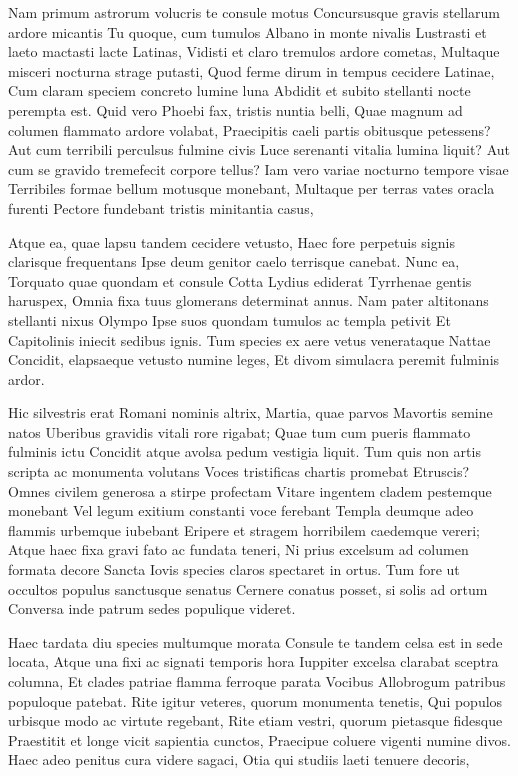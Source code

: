  Nam primum astrorum volucris te consule motus Concursusque gravis stellarum ardore micantis Tu quoque, cum tumulos Albano in monte nivalis Lustrasti et laeto mactasti lacte Latinas, Vidisti et claro tremulos ardore cometas, Multaque misceri nocturna strage putasti, Quod ferme dirum in tempus cecidere Latinae, Cum claram speciem concreto lumine luna Abdidit et subito stellanti nocte perempta est. Quid vero Phoebi fax, tristis nuntia belli, Quae magnum ad columen flammato ardore volabat, Praecipitis caeli partis obitusque petessens? Aut cum terribili perculsus fulmine civis Luce serenanti vitalia lumina liquit? Aut cum se gravido tremefecit corpore tellus? Iam vero variae nocturno tempore visae Terribiles formae bellum motusque monebant, Multaque per terras vates oracla furenti Pectore fundebant tristis minitantia casus,

 Atque ea, quae lapsu tandem cecidere vetusto, Haec fore perpetuis signis clarisque frequentans Ipse deum genitor caelo terrisque canebat. Nunc ea, Torquato quae quondam et consule Cotta Lydius ediderat Tyrrhenae gentis haruspex, Omnia fixa tuus glomerans determinat annus. Nam pater altitonans stellanti nixus Olympo Ipse suos quondam tumulos ac templa petivit Et Capitolinis iniecit sedibus ignis. Tum species ex aere vetus venerataque Nattae Concidit, elapsaeque vetusto numine leges, Et divom simulacra peremit fulminis ardor.

 Hic silvestris erat Romani nominis altrix, Martia, quae parvos Mavortis semine natos Uberibus gravidis vitali rore rigabat; Quae tum cum pueris flammato fulminis ictu Concidit atque avolsa pedum vestigia liquit. Tum quis non artis scripta ac monumenta volutans Voces tristificas chartis promebat Etruscis? Omnes civilem generosa a stirpe profectam Vitare ingentem cladem pestemque monebant Vel legum exitium constanti voce ferebant Templa deumque adeo flammis urbemque iubebant Eripere et stragem horribilem caedemque vereri; Atque haec fixa gravi fato ac fundata teneri, Ni prius excelsum ad columen formata decore Sancta Iovis species claros spectaret in ortus. Tum fore ut occultos populus sanctusque senatus Cernere conatus posset, si solis ad ortum Conversa inde patrum sedes populique videret.

 Haec tardata diu species multumque morata Consule te tandem celsa est in sede locata, Atque una fixi ac signati temporis hora Iuppiter excelsa clarabat sceptra columna, Et clades patriae flamma ferroque parata Vocibus Allobrogum patribus populoque patebat. Rite igitur veteres, quorum monumenta tenetis, Qui populos urbisque modo ac virtute regebant, Rite etiam vestri, quorum pietasque fidesque Praestitit et longe vicit sapientia cunctos, Praecipue coluere vigenti numine divos. Haec adeo penitus cura videre sagaci, Otia qui studiis laeti tenuere decoris,

